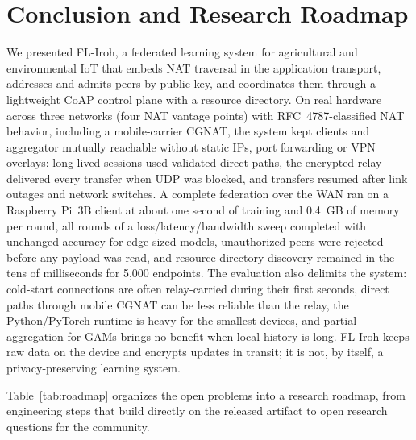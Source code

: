 \section{Conclusion and Research Roadmap}
\label{sec:conclusion}

We presented FL-Iroh, a federated learning system for agricultural and environmental IoT that embeds NAT traversal in the application transport, addresses and admits peers by public key, and coordinates them through a lightweight CoAP control plane with a resource directory. On real hardware across three networks (four NAT vantage points) with RFC~4787-classified NAT behavior, including a mobile-carrier CGNAT, the system kept clients and aggregator mutually reachable without static IPs, port forwarding or VPN overlays: long-lived sessions used validated direct paths, the encrypted relay delivered every transfer when UDP was blocked, and transfers resumed after link outages and network switches. A complete federation over the WAN ran on a Raspberry Pi~3B client at about one second of training and 0.4~GB of memory per round, all rounds of a loss/latency/bandwidth sweep completed with unchanged accuracy for edge-sized models, unauthorized peers were rejected before any payload was read, and resource-directory discovery remained in the tens of milliseconds for 5{,}000 endpoints. The evaluation also delimits the system: cold-start connections are often relay-carried during their first seconds, direct paths through mobile CGNAT can be less reliable than the relay, the Python/PyTorch runtime is heavy for the smallest devices, and partial aggregation for GAMs brings no benefit when local history is long. FL-Iroh keeps raw data on the device and encrypts updates in transit; it is not, by itself, a privacy-preserving learning system.

Table~\ref{tab:roadmap} organizes the open problems into a research roadmap, from engineering steps that build directly on the released artifact to open research questions for the community.

